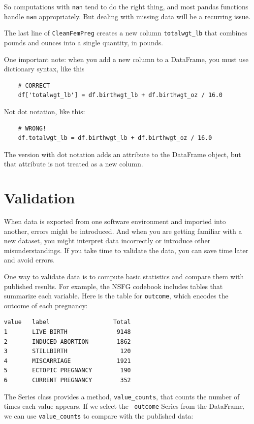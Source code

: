 \documentclass[12pt]{book}
\theoremstyle{exercise}
\begin{document}
So computations with {\tt nan} tend to do the right thing, and most
pandas functions handle {\tt nan} appropriately.  But dealing with
missing data will be a recurring issue.%
%

The last line of {\tt CleanFemPreg} creates a new
column \verb"totalwgt_lb" that combines pounds and ounces into
a single quantity, in pounds.

One important note: when you add a new column to a DataFrame, you
must use dictionary syntax, like this%

\begin{verbatim}
    # CORRECT
    df['totalwgt_lb'] = df.birthwgt_lb + df.birthwgt_oz / 16.0 
\end{verbatim}

Not dot notation, like this:

\begin{verbatim}
    # WRONG!
    df.totalwgt_lb = df.birthwgt_lb + df.birthwgt_oz / 16.0 
\end{verbatim}

The version with dot notation adds an attribute to the DataFrame
object, but that attribute is not treated as a new column.


\section{Validation}

When data is exported from one software environment and imported into
another, errors might be introduced.  And when you are
getting familiar with a new dataset, you might interpret data
incorrectly or introduce other misunderstandings.  If you take
time to validate the data, you can save time later and avoid errors.

One way to validate data is to compute basic statistics and compare
them with published results.  For example, the NSFG codebook includes
tables that summarize each variable.  Here is the table for
{\tt outcome}, which encodes the outcome of each pregnancy:

\begin{verbatim}
value   label                  Total
1       LIVE BIRTH              9148
2       INDUCED ABORTION        1862
3       STILLBIRTH               120
4       MISCARRIAGE             1921
5       ECTOPIC PREGNANCY        190
6       CURRENT PREGNANCY        352
\end{verbatim}

The Series class provides a method, \verb"value_counts", that
counts the number of times each value appears.  If we select the {\tt
  outcome} Series from the DataFrame, we can use \verb"value_counts"
to compare with the published data:%
%
\end{document}
